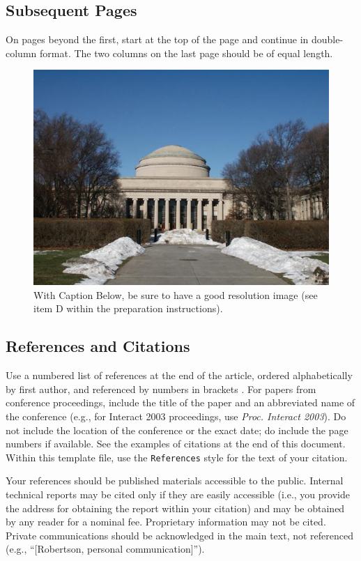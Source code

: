\documentclass{sigchi}
\begin{document}
\subsection{Subsequent Pages}

On pages beyond the first, start at the top of the page and continue
in double-column format.  The two columns on the last page should be
of equal length.

\begin{figure}[!h]
\centering
\includegraphics[width=0.9\columnwidth]{Figure1}
\caption{With Caption Below, be sure to have a good resolution image
  (see item D within the preparation instructions).}
\label{fig:figure1}
\end{figure}

\subsection{References and Citations}

Use a numbered list of references at the end of the article, ordered
alphabetically by first author, and referenced by numbers in brackets
\cite{ethics,
  Klemmer:2002:WSC:503376.503378,
  Mather:2000:MUT,
  Zellweger:2001:FAO:504216.504224}. For
papers from conference proceedings, include the title of the paper and
an abbreviated name of the conference (e.g., for Interact 2003
proceedings, use \textit{Proc. Interact 2003}). Do not include the
location of the conference or the exact date; do include the page
numbers if available. See the examples of citations at the end of this
document. Within this template file, use the \texttt{References} style
for the text of your citation.

Your references should be published materials accessible to the
public.  Internal technical reports may be cited only if they are
easily accessible (i.e., you provide the address for obtaining the
report within your citation) and may be obtained by any reader for a
nominal fee.  Proprietary information may not be cited. Private
communications should be acknowledged in the main text, not referenced
(e.g., ``[Robertson, personal communication]'').
\end{document}
